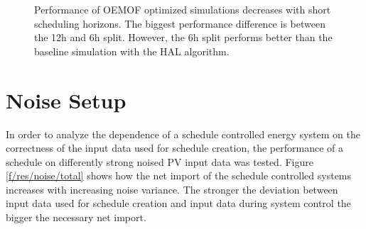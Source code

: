 \documentclass[a4paper,12pt]{book}
\theoremstyle{break}
\begin{document}
\begin{figure}[ht]
	\centering
	\caption{Performance of \ac{OEMOF} optimized simulations decreases with short scheduling horizons. The biggest performance difference is between the 12h and 6h split. However, the 6h split performs better than the baseline simulation with the HAL algorithm.}%
	\label{f/res/incr/total}%
\end{figure}

\newpage
\section{Noise Setup}\label{s/res/noise}
In order to analyze the dependence of a schedule controlled energy system on the correctness of the input data used for schedule creation, the performance of a schedule on differently strong noised \ac{PV} input data was tested. Figure \ref{f/res/noise/total} shows how the net import of the schedule controlled systems increases with increasing noise variance. The stronger the deviation between input data used for schedule creation and input data during system control the bigger the necessary net import. 
\end{document}
